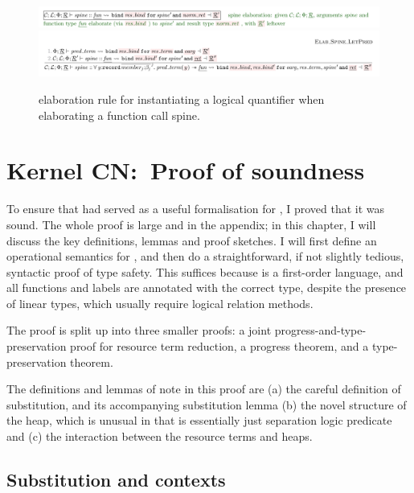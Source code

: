 \begin{figure}[tp]
    \includegraphics{figures/kernel-elab-spine-1}
    \includegraphics{figures/kernel-elab-spine-2}
    \caption{ elaboration rule for instantiating a logical
        quantifier when elaborating a function call spine.}\label{fig:elab-spine}
\end{figure}

\chapter{Kernel CN:\ Proof of soundness}%
\label{chap:kernel-soundness}

To ensure that  had served as a useful formalisation for ,
I proved that it was sound. The whole proof is large and in the appendix; in
this chapter, I will discuss the key definitions, lemmas and proof sketches. I
will first define an operational semantics for , and then do a
straightforward, if not slightly tedious, syntactic proof of type
safety. This suffices because  is a
first-order language, and all functions and labels are annotated with the
correct type,  despite the presence of linear types, which usually require
logical relation methods.

The proof is split up into three smaller proofs: a joint
progress-and-type-preservation proof for resource term reduction, a progress
theorem, and a type-preservation theorem.

The definitions and lemmas of note in this proof are (a) the careful definition
of substitution, and its accompanying substitution lemma (b) the novel
structure of the heap, which is unusual in that is essentially just separation
logic predicate and (c) the interaction between the resource terms and heaps.

\section{Substitution and contexts}\label{sec:sub-ctxts}

